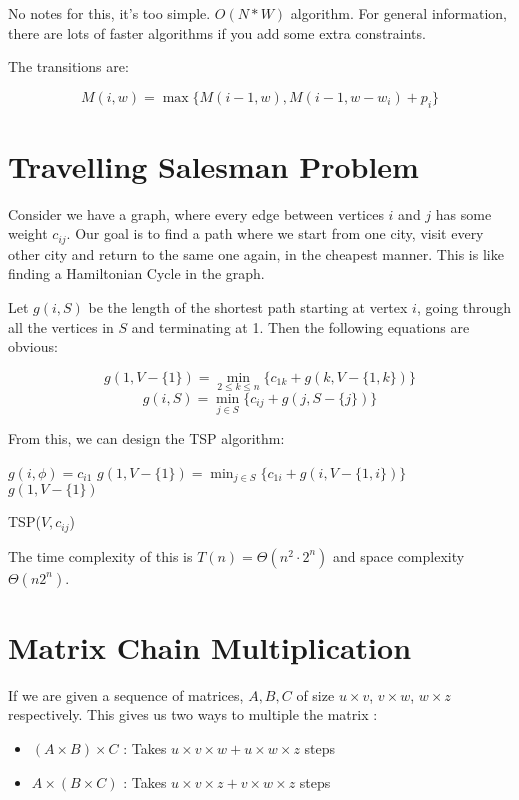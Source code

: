 \documentclass[12pt,letterpaper]{article}
\theoremstyle{definition}
\begin{document}
No notes for this, it's too simple. $O(N*W)$ algorithm. For general information, there are lots of faster algorithms if you add some extra constraints.

The transitions are:

\[M(i,w) = \max\{M(i-1,w), M(i-1,w-w_i) + p_i\}\]

\section{Travelling Salesman Problem}

Consider we have a graph, where every edge between vertices $i$ and $j$ has some weight $c_{ij}$. Our goal is to find a path where we start from one city, visit every other city and return to the same one again, in the cheapest manner. This is like finding a Hamiltonian Cycle in the graph.

Let $g(i,S)$ be the length of the shortest path starting at vertex $i$, going through all the vertices in $S$ and terminating at 1. Then the following equations are obvious:

\[g(1,V-\{1\}) = \min_{2 \leq k \leq n} \{c_{1k} + g(k,V-\{1,k\})\}\]
\[g(i,S) = \min_{j \in S} \{c_{ij} + g(j,S-\{j\})\}\]

From this, we can design the TSP algorithm:

\begin{algorithm}[H]
  \SetAlgoLined
   {
    $g(i,\phi) = c_{i1}$
  }
  $g(1,V-\{1\}) = \min_{j \in S} \{c_{1i} + g(i,V-\{1,i\})\}$ \\
  \Return $g(1,V-\{1\})$
  \caption{TSP($V,c_{ij}$)}
\end{algorithm}

The time complexity of this is $T(n) = \Theta(n^2 \cdot 2^n)$ and space complexity $\Theta(n2^n)$.

\section{Matrix Chain Multiplication}

If we are given a sequence of matrices, $A,B,C$ of size $u \times v$, $v \times w$, $w \times z$ respectively. This gives us two ways to multiple the matrix :

\begin{itemize}
  \item $(A \times B) \times C$ : Takes $u \times v \times w + u \times w \times z$ steps
  \item $A \times (B \times C)$ : Takes $u \times v \times z + v \times w \times z$ steps
\end{itemize}
\end{document}
